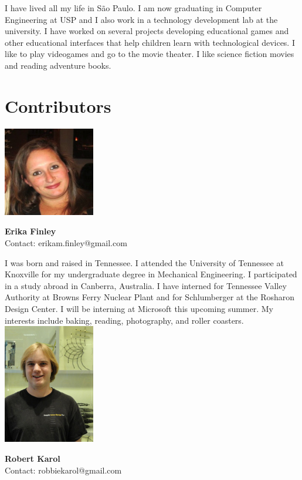 I have lived all my life in S\~{a}o Paulo. I am now graduating in Computer Engineering at USP and I also work in a technology development lab at the university. I have worked on several projects developing educational games and other educational interfaces that help children learn with technological devices.  I like to play videogames and go to the movie theater. I like science fiction movies and reading adventure books.
\\ 


\section{Contributors}

\noindent \includegraphics[width=40mm]{images/image012.jpg}
\parbox[b]{0.6\textwidth}{\textbf{Erika Finley}\\ 
Contact: erikam.finley@gmail.com  \\
}

I was born and raised in Tennessee. I attended the University of Tennessee at Knoxville for my undergraduate degree in Mechanical Engineering. I participated in a study abroad in Canberra, Australia. I have interned for Tennessee Valley Authority at Browns Ferry Nuclear Plant and for Schlumberger at the Rosharon Design Center. I will be interning at Microsoft this upcoming summer. My interests include baking, reading, photography, and roller coasters.
\\
\newpage
\noindent \includegraphics[width=40mm]{images/robert_karol.jpg}
\parbox[b]{0.6\textwidth}{\textbf{Robert Karol}\\ 
Contact: robbiekarol@gmail.com  \\
}

